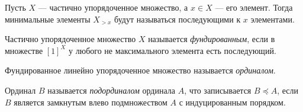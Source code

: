 \documentclass[
	extrafontsizes,
	11pt,
	hyphens,
]{memoir}
\begin{document}


\begin{definition}
Пусть \(X\) --- частично упорядоченное множество, а \(x \in X\) --- его элемент. Тогда минимальные элементы \(X_{> x}\) будут называться последующими к \(x\) элементами.
\end{definition}

\begin{definition}
Частично упорядоченное множество \(X\) называется \emph{фундированным}, если в множестве \([1]^X\) у любого не максимального элемента есть последующий.
\end{definition}

\begin{definition}
Фундированное линейно упорядоченное множество называется \emph{ординалом}.
\end{definition}

\begin{definition}
Ординал \(B\) называется \emph{подординалом} ординала \(A\), что записывается \(B \preccurlyeq A\), если \(B\) является замкнутым влево подмножеством \(A\) с индуцированным порядком.
\end{definition}


\end{document}
